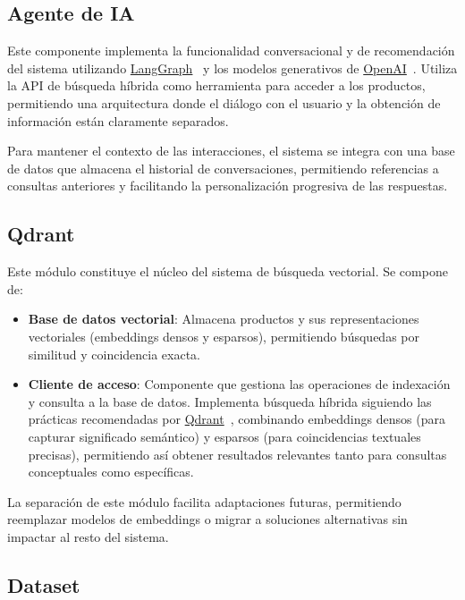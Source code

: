\documentclass[12pt]{article}
\begin{document}
\subsection{Agente de IA}

Este componente implementa la funcionalidad conversacional y de recomendación del sistema utilizando \href{https://www.langchain.com/langgraph}{LangGraph}~\cite{LangGraph} y los modelos generativos de \href{https://openai.com/}{OpenAI}~\cite{OpenAI}. Utiliza la API de búsqueda híbrida como herramienta para acceder a los productos, permitiendo una arquitectura donde el diálogo con el usuario y la obtención de información están claramente separados.

Para mantener el contexto de las interacciones, el sistema se integra con una base de datos que almacena el historial de conversaciones, permitiendo referencias a consultas anteriores y facilitando la personalización progresiva de las respuestas.

\subsection{Qdrant}

Este módulo constituye el núcleo del sistema de búsqueda vectorial. Se compone de:

\begin{itemize}
    \item \textbf{Base de datos vectorial}: Almacena productos y sus representaciones vectoriales (embeddings densos y esparsos), permitiendo búsquedas por similitud y coincidencia exacta.

    \item \textbf{Cliente de acceso}: Componente que gestiona las operaciones de indexación y consulta a la base de datos. Implementa búsqueda híbrida siguiendo las prácticas recomendadas por \href{https://qdrant.tech/documentation/search-precision/reranking-hybrid-search/}{Qdrant}~\cite{Qdrant}, combinando embeddings densos (para capturar significado semántico) y esparsos (para coincidencias textuales precisas), permitiendo así obtener resultados relevantes tanto para consultas conceptuales como específicas.
\end{itemize}

La separación de este módulo facilita adaptaciones futuras, permitiendo reemplazar modelos de embeddings o migrar a soluciones alternativas sin impactar al resto del sistema.

\subsection{Dataset}
\end{document}
